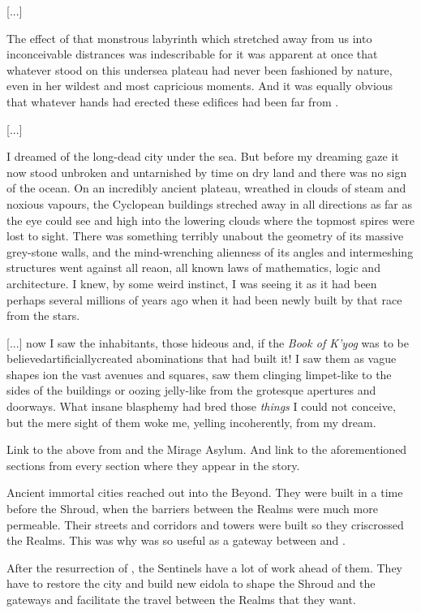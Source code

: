   [...]
  
  The effect of that monstrous labyrinth which stretched away from us into inconceivable distrances was indescribable for it was apparent at once that whatever stood on this undersea plateau had never been fashioned by nature, even in her wildest and most capricious moments. 
  And it was equally obvious that whatever hands had erected these edifices had been far from \human. 
  
  [...]
  
  I dreamed of the long-dead city under the sea.
  But before my dreaming gaze it now stood unbroken and untarnished by time on dry land and there was no sign of the ocean.
  On an incredibly ancient plateau, wreathed in clouds of steam and noxious vapours, the Cyclopean buildings streched away in all directions as far as the eye could see and high into the lowering clouds where the topmost spires were lost to sight.
  There was something terribly un\human about the geometry of its massive grey-stone walls, and the mind-wrenching alienness of its angles and intermeshing structures went against all reaon, all known laws of mathematics, logic and architecture.
  I knew, by some weird instinct, I was seeing it as it had been perhaps several millions of years ago when it had been newly built by that race from the stars. 
  
  [...] now I saw the inhabitants, those hideous and, if the \emph{Book of K'yog} was to be believed\dash{}artificially\dash{}created abominations that had built it!
  I saw them as vague shapes ion the vast avenues and squares, saw them clinging limpet-like to the sides of the buildings or oozing jelly-like from the grotesque apertures and doorways.
  What insane blasphemy had bred those \emph{things} I could not conceive, but the mere sight of them woke me, yelling incoherently, from my dream. 

Link to the above from \Nithdornazsh and the Mirage Asylum. 
And link to the aforementioned sections from every section where they appear in the story. 

Ancient immortal cities reached out into the Beyond. 
They were built in a time before the Shroud, when the barriers between the Realms were much more permeable. 
Their streets and corridors and towers were built so they criscrossed the Realms. 
This was why \Nithdornazsh was so useful as a gateway between \Machai and \Azmith. 

After the resurrection of \Nithdornazsh, the Sentinels have a lot of work ahead of them.
They have to restore the city and build new eidola to shape the Shroud and the gateways and facilitate the travel between the Realms that they want. 


